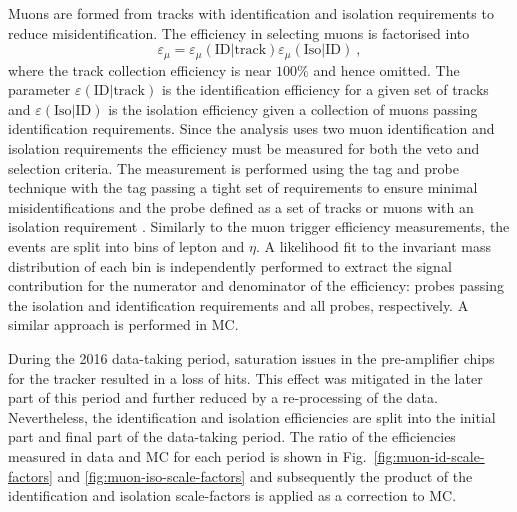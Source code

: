 Muons are formed from tracks with identification and isolation requirements to reduce misidentification. The efficiency in selecting muons is factorised into
%
\begin{equation}
    \varepsilon_{\mu} = \varepsilon_{\mu}(\mathrm{ID}|\mathrm{track}) \varepsilon_{\mu}(\mathrm{Iso}|\mathrm{ID})\ ,
\end{equation}
%
where the track collection efficiency is near $100\%$ and hence omitted. The parameter $\varepsilon(\mathrm{ID}|\mathrm{track})$ is the identification efficiency for a given set of tracks and $\varepsilon(\mathrm{Iso}|\mathrm{ID})$ is the isolation efficiency given a collection of muons passing identification requirements. Since the analysis uses two muon identification and isolation requirements the efficiency must be measured for both the veto and selection criteria. The measurement is performed using the tag and probe technique with the tag passing a tight set of requirements to ensure minimal misidentifications and the probe defined as a set of tracks or muons with an isolation requirement \cite{CMS-DP-2017-007}. Similarly to the muon trigger efficiency measurements, the events are split into bins of lepton \pt and $\eta$. A likelihood fit to the invariant mass distribution of each bin is independently performed to extract the signal contribution for the numerator and denominator of the efficiency: probes passing the isolation and identification requirements and all probes, respectively. A similar approach is performed in MC. %

During the 2016 data-taking period, saturation issues in the pre-amplifier
chips for the tracker resulted in a loss of hits. This effect was mitigated in
the later part of this period and further reduced by a re-processing of the
data. Nevertheless, the identification and isolation efficiencies are split
into the initial part and final part of the data-taking period. The ratio of
the efficiencies measured in data and MC for each period is shown in
Fig.~\ref{fig:muon-id-scale-factors} and \ref{fig:muon-iso-scale-factors} and
subsequently the product of the identification and isolation scale-factors is
applied as a correction to MC.

